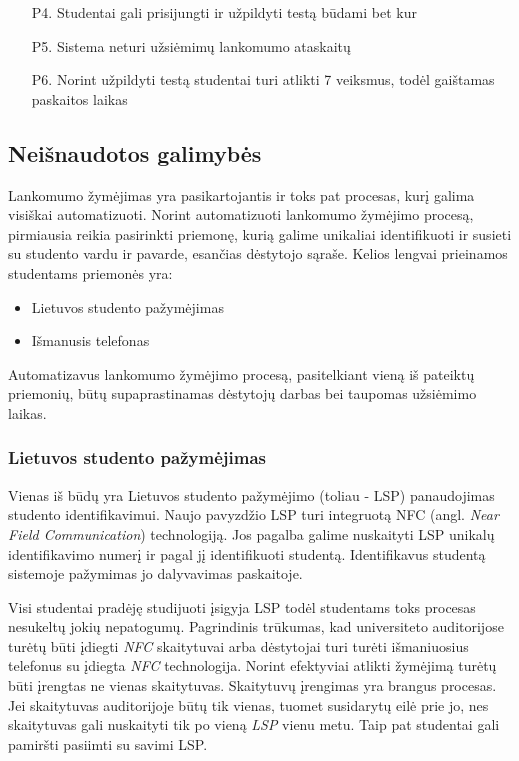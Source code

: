 \documentclass{VUMIFPSkursinis}
\begin{document}
\begin{itemize}
    \item[P4.] Studentai gali prisijungti ir užpildyti testą būdami bet kur
    \item[P5.] Sistema neturi užsiėmimų lankomumo ataskaitų
    \item[P6.] Norint užpildyti testą studentai turi atlikti 7 veiksmus, todėl gaištamas paskaitos laikas
\end{itemize}

\subsection{Neišnaudotos galimybės}

Lankomumo žymėjimas yra pasikartojantis ir toks pat procesas, kurį galima visiškai automatizuoti. Norint automatizuoti lankomumo žymėjimo procesą, pirmiausia reikia pasirinkti priemonę, kurią galime unikaliai identifikuoti ir susieti su studento vardu ir pavarde, esančias dėstytojo sąraše. Kelios lengvai prieinamos studentams priemonės yra:

\begin{itemize}
	\item Lietuvos studento pažymėjimas
	\item Išmanusis telefonas
\end{itemize}

Automatizavus lankomumo žymėjimo procesą, pasitelkiant vieną iš pateiktų priemonių, būtų supaprastinamas dėstytojų darbas bei taupomas užsiėmimo laikas. 

\subsubsection{Lietuvos studento pažymėjimas}
Vienas iš būdų yra Lietuvos studento pažymėjimo (toliau - LSP) panaudojimas studento identifikavimui. Naujo pavyzdžio LSP turi integruotą NFC (angl. \textit{Near Field Communication}) technologiją.  Jos pagalba galime nuskaityti LSP unikalų identifikavimo numerį ir pagal jį identifikuoti studentą. Identifikavus studentą sistemoje pažymimas jo dalyvavimas paskaitoje.

Visi studentai pradėję studijuoti įsigyja LSP todėl studentams toks procesas nesukeltų jokių nepatogumų. Pagrindinis trūkumas, kad universiteto auditorijose turėtų būti įdiegti \textit{NFC} skaitytuvai arba dėstytojai turi turėti išmaniuosius telefonus su įdiegta \textit{NFC} technologija. Norint efektyviai atlikti žymėjimą turėtų būti įrengtas ne vienas skaitytuvas. Skaitytuvų įrengimas yra brangus procesas. Jei skaitytuvas auditorijoje būtų tik vienas, tuomet susidarytų eilė prie jo, nes skaitytuvas gali nuskaityti tik po vieną \textit{LSP} vienu metu. Taip pat studentai gali pamiršti pasiimti su savimi LSP.
\end{document}
